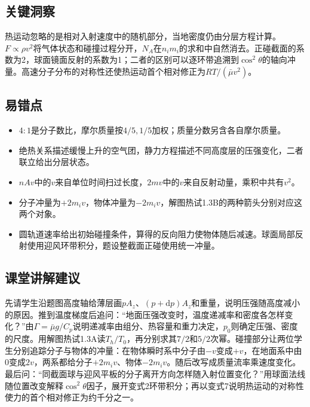 \documentclass[UTF8,fontset=fandol,a4paper,11pt]{ctexart}
\begin{document}


\subsection*{关键洞察}

热运动忽略的是相对入射速度中的随机部分，当地密度仍由分层方程计算。$F\propto\rho v^2$将气体状态和碰撞过程分开，$N_A$在$n_i m_i$的求和中自然消去。正碰截面的系数为2，球面镜面反射的系数为1；二者的区别可以逐环带追溯到$\cos^2\theta$的轴向冲量。高速分子分布的对称性还使热运动首个相对修正为$RT/(\bar\mu v^2)$。



\subsection*{易错点}

\begin{itemize}
\item $4:1$是分子数比，摩尔质量按$4/5,1/5$加权；质量分数另含各自摩尔质量。
\item 绝热关系描述缓慢上升的空气团，静力方程描述不同高度层的压强变化，二者联立给出分层状态。
\item $nAv$中的$v$来自单位时间扫过长度，$2mv$中的$v$来自反射动量，乘积中共有$v^2$。
\item 分子冲量为$+2m_iv$，物体冲量为$-2m_iv$，解图热试1.3B的两种箭头分别对应这两个对象。
\item 圆轨道速率给出初始碰撞条件，算得的反向阻力使物体随后减速。球面局部反射使用迎风环带积分，题设整截面正碰使用统一冲量。
\end{itemize}



\subsection*{课堂讲解建议}

先请学生沿题图高度轴给薄层画$pA_z$、$(p+\mathrm dp)A_z$和重量，说明压强随高度减小的原因。推到温度梯度后追问：“地面压强改变时，温度递减率和密度各怎样变化？”由$\Gamma=\bar\mu g/C_p$说明递减率由组分、热容量和重力决定，$p_0$则确定压强、密度的尺度。用解图热试1.3A读$T_h/T_0$，再分别求其$7/2$和$5/2$次幂。碰撞部分让两位学生分别追踪分子与物体的冲量：在物体瞬时系中分子由$-v$变成$+v$，在地面系中由0变成$2v$，两系都给分子$+2m_iv$、物体$-2m_iv$。随后改写成质量流率乘速度变化。最后问：“同截面球与迎风平板的分子离开方向怎样随入射位置变化？”用球面法线随位置改变解释$\cos^2\theta$因子，展开变式2环带积分；再以变式7说明热运动的对称性使力的首个相对修正为约千分之一。
\end{document}
